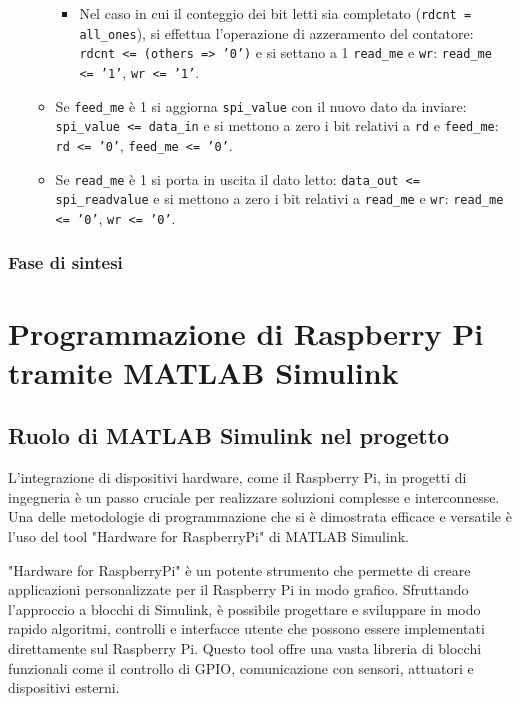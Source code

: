 \documentclass[titlepage]{report}
\begin{document}
\begin{itemize}
\begin{itemize}
\begin{itemize}
						\item Nel caso in cui il conteggio dei bit letti sia completato (\texttt{rdcnt = all\_ones}), si effettua l'operazione di azzeramento del contatore: \texttt{rdcnt <= (others => '0')} e si settano a 1 \texttt{read\_me} e \texttt{wr}: \texttt{read\_me <= '1'}, \texttt{wr <= '1'}.
					\end{itemize}
					\item Se \texttt{feed\_me} è 1 si aggiorna \texttt{spi\_value} con il nuovo dato da inviare: \texttt{spi\_value <= data\_in} e si mettono a zero i bit relativi a \texttt{rd} e \texttt{feed\_me}: \texttt{rd <= '0'}, \texttt{feed\_me <= '0'}.
					\item Se \texttt{read\_me} è 1 si porta in uscita il dato letto: \texttt{data\_out <= spi\_readvalue} e si mettono a zero i bit relativi a \texttt{read\_me} e \texttt{wr}: \texttt{read\_me <= '0'}, \texttt{wr <= '0'}.
				\end{itemize}
			\end{itemize}

		\subsection*{Fase di sintesi}
		\label{subsec:spi_sintesi}
			
\chapter*{Programmazione di Raspberry Pi tramite MATLAB Simulink}
\label{ch:programmazione_raspberrypi}

	\section{Ruolo di MATLAB Simulink nel progetto}
	\label{sec:ruolo_simulink}

		L'integrazione di dispositivi hardware, come il Raspberry Pi, in progetti di ingegneria è un passo cruciale per realizzare soluzioni complesse e interconnesse. Una delle metodologie di programmazione che si è dimostrata efficace e versatile è l'uso del tool "Hardware for RaspberryPi" di MATLAB Simulink.

		"Hardware for RaspberryPi" è un potente strumento che permette di creare applicazioni personalizzate per il Raspberry Pi in modo grafico. Sfruttando l'approccio a blocchi di Simulink, è possibile progettare e sviluppare in modo rapido algoritmi, controlli e interfacce utente che possono essere implementati direttamente sul Raspberry Pi. Questo tool offre una vasta libreria di blocchi funzionali come il controllo di GPIO, comunicazione con sensori, attuatori e dispositivi esterni. 
		
\end{document}

